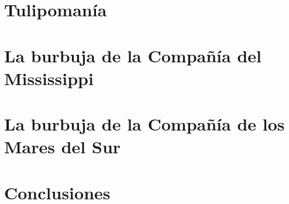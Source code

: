 \documentclass[a4paper,11pt]{scrbook} %
\begin{document}
\chapter{Tulipomanía}



\chapter{La burbuja de la Compañía del Mississippi}



\chapter{La burbuja de la Compañía de los Mares del Sur}




\backmatter                                               %

\chapter{Conclusiones}










\end{document}
